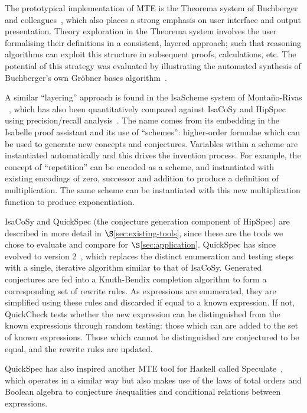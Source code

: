 The prototypical implementation of MTE is the Theorema system of Buchberger and
colleagues~\cite{buchberger,buchberger2016theorema}, which also places a strong
emphasis on user interface and output presentation. Theory exploration in the
Theorema system involves the user formalising their definitions in a consistent,
layered approach; such that reasoning algorithms can exploit this structure in
subsequent proofs, calculations, etc. The potential of this strategy was
evaluated by illustrating the automated synthesis of Buchberger's own Gr\"obner
bases algorithm~\cite{buchberger:04}.

A similar ``layering'' approach is found in the IsaScheme system of
Monta{\~n}o-Rivas \etal{}~\cite{Montano-Rivas.McCasland.Dixon.ea:2012}, which
has also been quantitatively compared against IsaCoSy and HipSpec using
precision/recall analysis~\cite{claessen2013automating}. The name comes from its
embedding in the Isabelle proof assistant and its use of ``schemes'':
higher-order formulae which can be used to generate new concepts and
conjectures. Variables within a scheme are instantiated automatically and this
drives the invention process. For example, the concept of ``repetition'' can be
encoded as a scheme, and instantiated with existing encodings of zero, successor
and addition to produce a definition of multiplication. The same scheme can be
instantiated with this new multiplication function to produce exponentiation.

IsaCoSy and QuickSpec (the conjecture generation component of HipSpec) are
described in more detail in $\S$\ref{sec:existing-tools}, since these are the
tools we chose to evaluate and compare for $\S$\ref{sec:application}. QuickSpec
has since evolved to version 2~\cite{smallbone2017quick}, which replaces the
distinct enumeration and testing steps with a single, iterative algorithm
similar to that of IsaCoSy. Generated conjectures are fed into a Knuth-Bendix
completion algorithm to form a corresponding set of rewrite rules. As
expressions are enumerated, they are simplified using these rules and discarded
if equal to a known expression. If not, QuickCheck tests whether the new
expression can be distinguished from the known expressions through random
testing: those which can are added to the set of known expressions. Those which
cannot be distinguished are conjectured to be equal, and the rewrite rules are
updated.

QuickSpec has also inspired another MTE tool for Haskell called
Speculate~\cite{braquehais2017speculate}, which operates in a similar way but
also makes use of the laws of total orders and Boolean algebra to conjecture
\emph{in}equalities and conditional relations between expressions.

